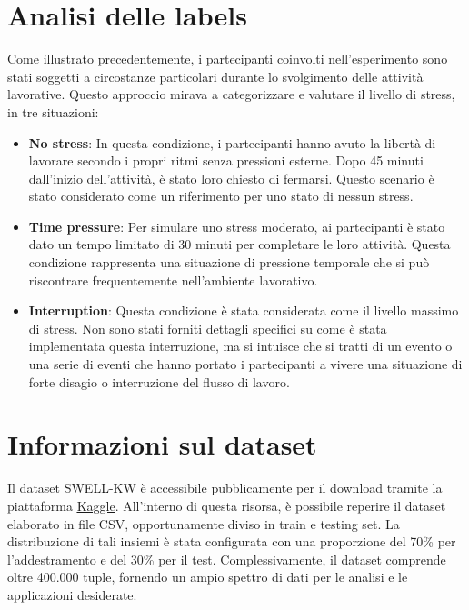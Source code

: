 \section{Analisi delle labels}

Come illustrato precedentemente, i partecipanti coinvolti nell'esperimento sono stati soggetti a circostanze particolari durante lo svolgimento delle attività lavorative. Questo approccio mirava a categorizzare e valutare il livello di stress, in tre situazioni:

\begin{itemize}
    \item \textbf{No stress}: In questa condizione, i partecipanti hanno avuto la libertà di lavorare secondo i propri ritmi senza pressioni esterne. Dopo 45 minuti dall'inizio dell'attività, è stato loro chiesto di fermarsi. Questo scenario è stato considerato come un riferimento per uno stato di nessun stress.
    \item \textbf{Time pressure}: Per simulare uno stress moderato, ai partecipanti è stato dato un tempo limitato di 30 minuti per completare le loro attività. Questa condizione rappresenta una situazione di pressione temporale che si può riscontrare frequentemente nell'ambiente lavorativo.
    \item \textbf{Interruption}: Questa condizione è stata considerata come il livello massimo di stress. Non sono stati forniti dettagli specifici su come è stata implementata questa interruzione, ma si intuisce che si tratti di un evento o una serie di eventi che hanno portato i partecipanti a vivere una situazione di forte disagio o interruzione del flusso di lavoro.
\end{itemize}

\section{Informazioni sul dataset}

Il dataset SWELL-KW è accessibile pubblicamente per il download tramite la piattaforma \href{https://www.kaggle.com/datasets/qiriro/swell-heart-rate-variability-hrv}{\underline{Kaggle}}. All'interno di questa risorsa, è possibile reperire il dataset elaborato in file CSV, opportunamente diviso in train e testing set. La distribuzione di tali insiemi è stata configurata con una proporzione del 70\% per l'addestramento e del 30\% per il test. Complessivamente, il dataset comprende oltre 400.000 tuple, fornendo un ampio spettro di dati per le analisi e le applicazioni desiderate.